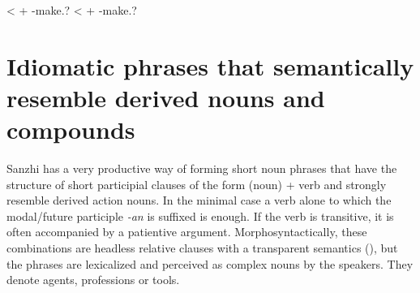 \begin{exe}
	\ex	\label{ex:CompoundNounsNumerals2} 
	\begin{xlist}
		\TabPositions{9em,11em}					
			\ex	{}			\tab	<	\tab	 {}  +  -make.? 
			\ex	{}				\tab	<	\tab	 {}  +  -make.? 
	\end{xlist}
\end{exe}	



\section[Idiomatic phrases]{Idiomatic phrases that semantically resemble derived nouns and compounds}
\label{ssec:N-genN}
Sanzhi has a very productive way of forming short noun phrases that have the structure of short participial clauses of the form (noun) + verb and strongly resemble derived action nouns. In the minimal case a verb alone to which the modal/future participle \textit{-an} is suffixed is enough. If the verb is transitive, it is often accompanied by a patientive argument. Morphosyntactically, these combinations are headless relative clauses with a transparent semantics (), but the phrases are lexicalized and perceived as complex nouns by the speakers. They denote agents, professions or tools.

